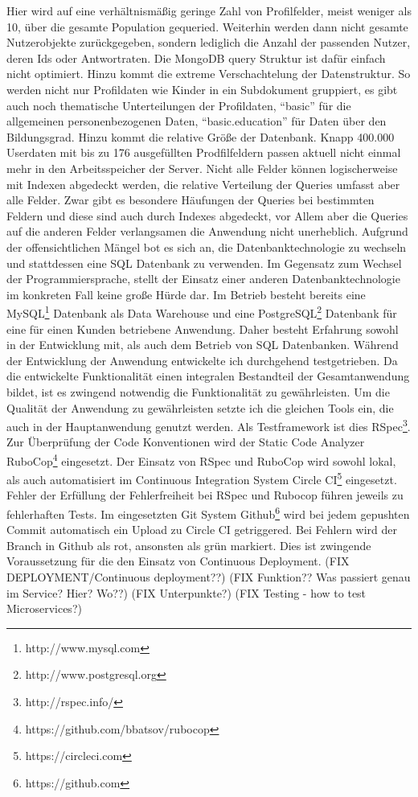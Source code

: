 Hier wird auf eine verhältnismäßig geringe Zahl von Profilfelder, meist weniger als 10, über die gesamte Population gequeried. Weiterhin werden dann nicht gesamte Nutzerobjekte zurückgegeben, sondern lediglich die Anzahl der passenden Nutzer, deren Ids oder Antwortraten. Die MongoDB query Struktur ist dafür einfach nicht optimiert. Hinzu kommt die extreme Verschachtelung der Datenstruktur. So werden nicht nur Profildaten wie Kinder in ein Subdokument gruppiert, es gibt auch noch thematische Unterteilungen der Profildaten, ``basic'' für die allgemeinen personenbezogenen Daten, ``basic.education'' für Daten über den Bildungsgrad.
Hinzu kommt die relative Größe der Datenbank. Knapp 400.000 Userdaten mit bis zu 176 ausgefüllten Prodfilfeldern passen aktuell nicht einmal mehr in den Arbeitsspeicher der Server. Nicht alle Felder können logischerweise mit Indexen abgedeckt werden, die relative Verteilung der Queries umfasst aber alle Felder. Zwar gibt es besondere Häufungen der Queries bei bestimmten Feldern und diese sind auch durch Indexes abgedeckt, vor Allem aber die Queries auf die anderen Felder verlangsamen die Anwendung nicht unerheblich.
Aufgrund der offensichtlichen Mängel bot es sich an, die Datenbanktechnologie zu wechseln und stattdessen eine SQL Datenbank zu verwenden. Im Gegensatz zum Wechsel der Programmiersprache, stellt der Einsatz einer anderen Datenbanktechnologie im konkreten Fall keine große Hürde dar. Im Betrieb besteht bereits eine MySQL\footnote{http://www.mysql.com} Datenbank als Data Warehouse und eine PostgreSQL\footnote{http://www.postgresql.org} Datenbank für eine für einen Kunden betriebene Anwendung. Daher besteht Erfahrung sowohl in der Entwicklung mit, als auch dem Betrieb von SQL Datenbanken.
Während der Entwicklung der Anwendung entwickelte ich durchgehend testgetrieben. Da die entwickelte Funktionalität einen integralen Bestandteil der Gesamtanwendung bildet, ist es zwingend notwendig die Funktionalität zu gewährleisten. Um die Qualität der Anwendung zu gewährleisten setzte ich die gleichen Tools ein, die auch in der Hauptanwendung genutzt werden. Als Testframework ist dies RSpec\footnote{http://rspec.info/}. Zur Überprüfung der Code Konventionen wird der Static Code Analyzer RuboCop\footnote{https://github.com/bbatsov/rubocop} eingesetzt. Der Einsatz von RSpec und RuboCop wird sowohl lokal, als auch automatisiert im Continuous Integration System Circle CI\footnote{https://circleci.com} eingesetzt. Fehler der Erfüllung der Fehlerfreiheit bei RSpec und Rubocop führen jeweils zu fehlerhaften Tests. Im eingesetzten Git System Github\footnote{https://github.com} wird bei jedem gepushten Commit automatisch ein Upload zu Circle CI getriggered. Bei Fehlern wird der Branch in Github als rot, ansonsten als grün markiert. Dies ist zwingende Voraussetzung für die den Einsatz von Continuous Deployment.
(FIX DEPLOYMENT/Continuous deployment??)
(FIX Funktion?? Was passiert genau im Service? Hier? Wo??)
(FIX Unterpunkte?)
(FIX Testing - how to test Microservices?)

